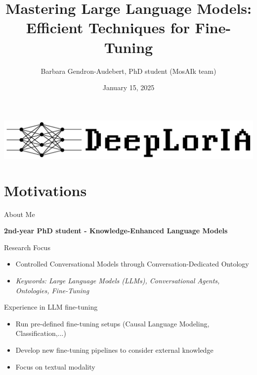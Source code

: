 \documentclass[11pt,aspectratio=169]{beamer}
\author[Barbara Gendron]{\large Barbara Gendron-Audebert, PhD student (MosAIk team)}
\title[Mastering LLM Fine-Tuning]{\huge Mastering Large Language Models: Efficient Techniques for Fine-Tuning}
\date{January 15, 2025}
\institute[DeepLorIA tutorial]{\large LORIA, Université de Lorraine, CNRS\\ DeepLorIA Network}
\begin{document}
\begin{frame}[plain]
    \vspace*{5pt}
    \begin{center}
        \includegraphics[scale=0.35]{DeepLorIA_logo1.png}
    \end{center}
    \titlepage
\end{frame}

\section{Motivations}

\begin{frame}{About Me}
\begin{center}
    \textbf{2nd-year PhD student - Knowledge-Enhanced Language Models}
\end{center}
\vspace{0.5cm}
Research Focus
    \begin{itemize}
        \item Controlled Conversational Models through Conversation-Dedicated Ontology
        \item \textsl{Keywords: Large Language Models (LLMs), Conversational Agents, Ontologies, Fine-Tuning}
    \end{itemize}


\vspace{0.6cm}
Experience in LLM fine-tuning
    \begin{itemize}
        \item Run pre-defined fine-tuning setups (Causal Language Modeling, Classification,...)
        \item Develop new fine-tuning pipelines to consider external knowledge
        \item Focus on textual modality
    \end{itemize}
\end{frame}
\end{document}
